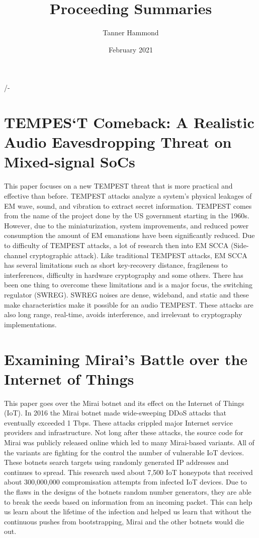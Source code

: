 /-\documentclass{article}
\title{Proceeding Summaries}
\author{Tanner Hammond }
\date{February 2021}
\begin{document}
\maketitle

\section{TEMPES`T Comeback: A Realistic Audio Eavesdropping Threat on Mixed-signal SoCs \cite{CH20}}

This paper focuses on a new TEMPEST threat that is more practical and effective than before. TEMPEST attacks analyze a system's physical leakages of EM wave, sound, and vibration to extract secret information. TEMPEST comes from the name of the project done by the US government starting in the 1960s. However, due to the miniaturization, system improvements, and reduced power consumption the amount of EM emanations have been significantly reduced. Due to difficulty of TEMPEST attacks, a lot of research then into EM SCCA (Side-channel cryptographic attack). Like traditional TEMPEST attacks, EM SCCA has several limitations such as short key-recovery distance, fragileness to interferences, difficulty in hardware cryptography and some others. There has been one thing to overcome these limitations and is a major focus, the switching regulator (SWREG). SWREG noises are dense, wideband, and static and these make characteristics make it possible for an audio TEMPEST. These attacks are also long range, real-time, avoids interference, and irrelevant to cryptography implementations.

\section{Examining Mirai's Battle over the Internet of Things \cite{GR20}}

This paper goes over the Mirai botnet and its effect on the Internet of Things (IoT). In 2016 the Mirai botnet made wide-sweeping DDoS attacks that eventually exceeded 1 Tbps. These attacks crippled major Internet service providers and infrastructure. Not long after these attacks, the source code for Mirai was publicly released online which led to many Mirai-based variants. All of the variants are fighting for the control the number of vulnerable IoT devices. These botnets search targets using randomly generated IP addresses and continues to spread. This research used about 7,500 IoT honeypots that received about 300,000,000 compromisation attempts from infected IoT devices. Due to the flaws in the designs of the botnets random number generators, they are able to break the seeds based on information from an incoming packet. This can help us learn about the lifetime of the infection and helped us learn that without the continuous pushes from bootstrapping, Mirai and the other botnets would die out.
\end{document}
